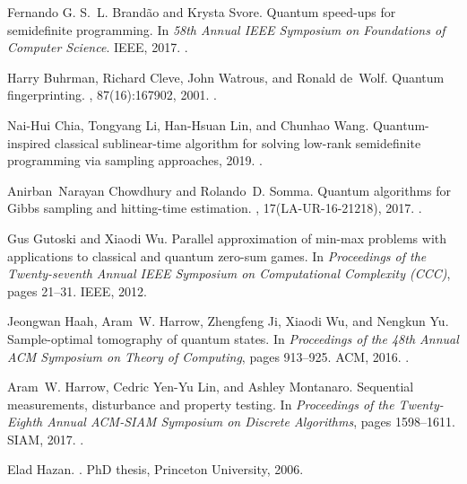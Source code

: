 \documentclass[a4paper,UKenglish,cleveref, autoref]{lipics-v2019}
\theoremstyle{remark}
\numberwithin{equation}{section}
\numberwithin{oracle}{section}
\numberwithin{remark}{section}
\begin{document}
\begin{thebibliography}{10}
Fernando G. S.~L. Brand{\~a}o and Krysta Svore.
\newblock Quantum speed-ups for semidefinite programming.
\newblock In {\em 58th Annual IEEE Symposium on Foundations of Computer
  Science}. IEEE, 2017.
\newblock \href {http://arxiv.org/abs/1609.05537} {}.

Harry Buhrman, Richard Cleve, John Watrous, and Ronald de~Wolf.
\newblock Quantum fingerprinting.
, 87(16):167902, 2001.
\newblock \href {http://arxiv.org/abs/quant-ph/0102001}
  {}.

Nai-Hui Chia, Tongyang Li, Han-Hsuan Lin, and Chunhao Wang.
\newblock Quantum-inspired classical sublinear-time algorithm for solving
  low-rank semidefinite programming via sampling approaches, 2019.
\newblock \href {http://arxiv.org/abs/1901.03254} {}.

Anirban~Narayan Chowdhury and Rolando~D. Somma.
\newblock Quantum algorithms for {G}ibbs sampling and hitting-time estimation.
, 17(LA-UR-16-21218), 2017.
\newblock \href {http://arxiv.org/abs/1603.02940} {}.

Gus Gutoski and Xiaodi Wu.
\newblock Parallel approximation of min-max problems with applications to
  classical and quantum zero-sum games.
\newblock In {\em Proceedings of the Twenty-seventh Annual IEEE Symposium on
  Computational Complexity (CCC)}, pages 21--31. IEEE, 2012.

Jeongwan Haah, Aram~W. Harrow, Zhengfeng Ji, Xiaodi Wu, and Nengkun Yu.
\newblock Sample-optimal tomography of quantum states.
\newblock In {\em Proceedings of the 48th Annual ACM Symposium on Theory of
  Computing}, pages 913--925. ACM, 2016.
\newblock \href {http://arxiv.org/abs/1508.01797} {}.

Aram~W. Harrow, Cedric Yen-Yu Lin, and Ashley Montanaro.
\newblock Sequential measurements, disturbance and property testing.
\newblock In {\em Proceedings of the Twenty-Eighth Annual ACM-SIAM Symposium on
  Discrete Algorithms}, pages 1598--1611. SIAM, 2017.
\newblock \href {http://arxiv.org/abs/1607.03236} {}.

Elad Hazan.
.
\newblock PhD thesis, Princeton University, 2006.


\end{thebibliography}
\end{document}

